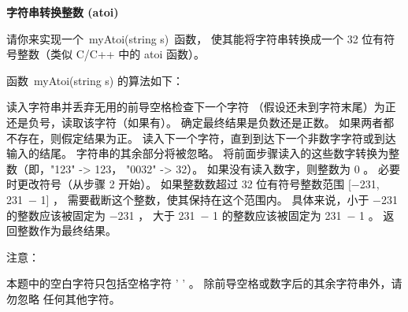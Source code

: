 \textbf{字符串转换整数 (atoi)}\par

请你来实现一个 myAtoi(string s) 函数，
使其能将字符串转换成一个 32 位有符号整数（类似 C/C++ 中的 atoi 函数）。\par

函数 myAtoi(string s) 的算法如下：\par

读入字符串并丢弃无用的前导空格检查下一个字符
（假设还未到字符末尾）为正还是负号，读取该字符（如果有）。 
确定最终结果是负数还是正数。 
如果两者都不存在，则假定结果为正。
读入下一个字符，直到到达下一个非数字字符或到达输入的结尾。
字符串的其余部分将被忽略。
将前面步骤读入的这些数字转换为整数（即，"123" -> 123， "0032" -> 32）。
如果没有读入数字，则整数为 0 。
必要时更改符号（从步骤 2 开始）。
如果整数数超过 32 位有符号整数范围 [−231,  231 − 1] ，
需要截断这个整数，使其保持在这个范围内。
具体来说，小于 −231 的整数应该被固定为 −231 ，
大于 231 − 1 的整数应该被固定为 231 − 1 。
返回整数作为最终结果。\par

注意：\par

本题中的空白字符只包括空格字符 ' ' 。
除前导空格或数字后的其余字符串外，请勿忽略 任何其他字符。\par


